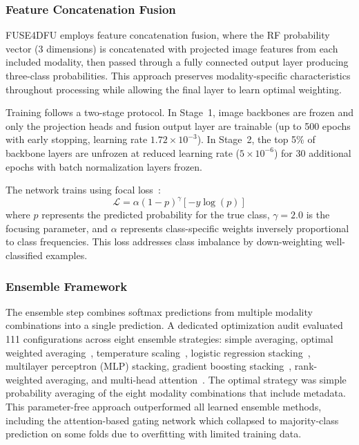 \documentclass[journal,twoside,web]{ieeecolor}
\begin{document}
\subsubsection{Feature Concatenation Fusion}
FUSE4DFU employs feature concatenation fusion, where the RF probability vector (3 dimensions) is concatenated with projected image features from each included modality, then passed through a fully connected output layer producing three\nobreakdash-class probabilities. This approach preserves modality\nobreakdash-specific characteristics throughout processing while allowing the final layer to learn optimal weighting.

Training follows a two\nobreakdash-stage protocol. In Stage~1, image backbones are frozen and only the projection heads and fusion output layer are trainable (up to 500 epochs with early stopping, learning rate $1.72 \times 10^{-3}$). In Stage~2, the top 5\% of backbone layers are unfrozen at reduced learning rate ($5 \times 10^{-6}$) for 30 additional epochs with batch normalization layers frozen.

The network trains using focal loss~\cite{lin2017focal}:
\begin{equation}
\mathcal{L} = \alpha (1 - p)^{\gamma} [-y \log(p)]
\end{equation}
where $p$ represents the predicted probability for the true class, $\gamma = 2.0$ is the focusing parameter, and $\alpha$ represents class\nobreakdash-specific weights inversely proportional to class frequencies. This loss addresses class imbalance by down\nobreakdash-weighting well\nobreakdash-classified examples.

\subsubsection{Ensemble Framework}
\label{sec:ensemble}
The ensemble step combines softmax predictions from multiple modality combinations into a single prediction. A dedicated optimization audit evaluated 111 configurations across eight ensemble strategies: simple averaging, optimal weighted averaging~\cite{breiman1996stacked}, temperature scaling~\cite{guo2017calibration}, logistic regression stacking~\cite{wolpert1992stacked}, multilayer perceptron (MLP) stacking, gradient boosting stacking~\cite{friedman2001greedy}, rank\nobreakdash-weighted averaging, and multi\nobreakdash-head attention~\cite{vaswani2017attention}. The optimal strategy was simple probability averaging of the eight modality combinations that include metadata. This parameter\nobreakdash-free approach outperformed all learned ensemble methods, including the attention\nobreakdash-based gating network which collapsed to majority\nobreakdash-class prediction on some folds due to overfitting with limited training data.
\end{document}
